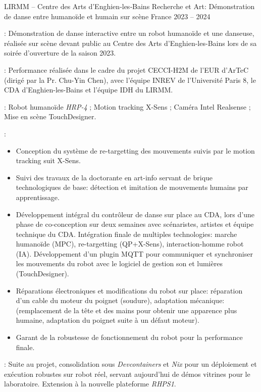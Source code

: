 \begin{cventries}
  \cventry
  {LIRMM -- Centre des Arts d’Enghien‑les‑Bains} %
  {Recherche et Art: Démonstration de danse entre humanoïde et humain sur scène} %
  {France} %
  {2023 -- 2024} %
  {
    \begin{cvitems}
    \item {} : Démonstration de danse interactive entre un robot humanoïde et
      une danseuse, réalisée sur scène devant public au Centre des Arts d'Enghien-les-Bains lors de sa soirée
      d'ouverture de la saison 2023.
    \item {} : Performance réalisée dans le cadre du projet CECCI-H2M de l'EUR
      d'ArTeC (dirigé par la Pr. Chu-Yin Chen), avec l'équipe INREV de l'Université Paris 8, le CDA
      d'Enghien-les-Bains et l'équipe IDH du LIRMM.
    \item {} : Robot humanoïde \emph{HRP-4} ; Motion
      tracking X-Sens ; Caméra Intel Realsense ; Mise en scène TouchDesigner.
    \item {} :
      \begin{itemize}
        \item Conception du système de re-targetting des mouvements suivis par le motion tracking suit X-Sens.
        \item Suivi des travaux de la doctorante en art-info servant de brique technologiques de base:
          détection et imitation de mouvements humains par apprentissage.
        \item Développement intégral du contrôleur de danse sur place au CDA, lors d'une phase de
          co-conception sur deux semaines avec scénaristes, artistes et équipe technique du CDA. Intégration
          finale de multiples technologies: marche humanoïde (MPC), re-targetting (QP+X-Sens),
          interaction-homme robot (IA). Développement d'un plugin MQTT pour communiquer et synchroniser les
          mouvements du robot avec le logiciel de gestion son et lumières (TouchDesigner).
        \item Réparations électroniques et modifications du robot sur place: réparation d'un cable du moteur
          du poignet (soudure), adaptation mécanique: (remplacement de la tête et des mains pour obtenir une
          apparence plus humaine, adaptation du poignet suite à un défaut moteur).
        \item Garant de la robustesse de fonctionnement du robot pour la performance finale.
      \end{itemize}
    \item {}: Suite au projet, consolidation sous
      \emph{Devcontainers} et \emph{Nix} pour un déploiement et exécution robustes sur robot réel, servant
      aujourd'hui de démos vitrines pour le laboratoire. Extension à la nouvelle plateforme \emph{RHPS1}.
    \end{cvitems}
  }


\end{cventries}
